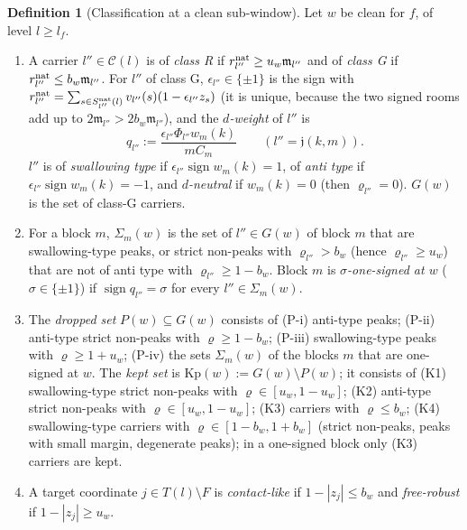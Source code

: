 \documentclass[10pt]{amsart}
\theoremstyle{definition}
\newtheorem{definition}[theorem]{Definition}
\theoremstyle{remark}
\newcommand{\sgn}{\operatorname{sign}}
\begin{document}
\begin{definition}[Classification at a clean sub-window]\label{def:II-class}
Let $w$ be clean for $f$, of level $l\ge l_f$.
\begin{enumerate}
\item[(a)] A carrier $l''\in\mathcal C(l)$ is of \emph{class R} if
$r^{\rm nat}_{l''}\ge u_w\mathfrak m_{l''}$ and of \emph{class G} if
$r^{\rm nat}_{l''}\le b_w\mathfrak m_{l''}$.  For $l''$ of class G,
$\epsilon_{l''}\in\{\pm1\}$ is the sign with $r^{\rm nat}_{l''}=\sum_{s\in
S^{\rm nat}_{l''}(l)}v_{l''}(s)(1-\epsilon_{l''}z_s)$ (it is unique,
because the two signed rooms add up to $2\mathfrak m_{l''}>2b_w
\mathfrak m_{l''}$), and the \emph{$d$-weight} of $l''$ is
\[
 q_{l''}:=\frac{\epsilon_{l''}\Phi_{l''}w_m(k)}{mC_m}\qquad
 (l''=\mathfrak j(k,m)).
\]
$l''$ is of \emph{swallowing type} if $\epsilon_{l''}\sgn w_m(k)=1$, of
\emph{anti type} if $\epsilon_{l''}\sgn w_m(k)=-1$, and \emph{$d$-neutral}
if $w_m(k)=0$ (then $\varrho_{l''}=0$).  $G(w)$ is the set of class-G
carriers.
\item[(b)] For a block $m$, $\Sigma_m(w)$ is the set of $l''\in G(w)$ of
block $m$ that are swallowing-type peaks, or strict non-peaks with
$\varrho_{l''}>b_w$ (hence $\varrho_{l''}\ge u_w$) that are not of anti type with
$\varrho_{l''}\ge1-b_w$.  Block $m$ is \emph{$\sigma$-one-signed at $w$}
($\sigma\in\{\pm1\}$) if $\sgn q_{l''}=\sigma$ for every $l''\in\Sigma_m(w)$.
\item[(c)] The \emph{dropped set} $P(w)\subseteq G(w)$ consists of
(P-i) anti-type peaks; (P-ii) anti-type strict non-peaks with $\varrho\ge
1-b_w$; (P-iii) swallowing-type peaks with $\varrho\ge1+u_w$; (P-iv) the sets
$\Sigma_m(w)$ of the blocks $m$ that are one-signed at $w$.  The \emph{kept
set} is $\mathrm{Kp}(w):=G(w)\setminus P(w)$; it consists of (K1)
swallowing-type strict non-peaks with $\varrho\in[u_w,1-u_w]$; (K2) anti-type
strict non-peaks with $\varrho\in[u_w,1-u_w]$; (K3) carriers with $\varrho\le b_w$;
(K4) swallowing-type carriers with $\varrho\in[1-b_w,1+b_w]$ (strict non-peaks,
peaks with small margin, degenerate peaks); in a one-signed block only
(K3) carriers are kept.
\item[(d)] A target coordinate $j\in T(l)\setminus F$ is
\emph{contact-like} if $1-|z_j|\le b_w$ and \emph{free-robust} if
$1-|z_j|\ge u_w$.
\end{enumerate}
\end{definition}
\end{document}

